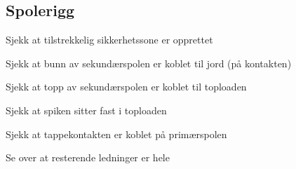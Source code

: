 \subsection{Spolerigg}
\begin{todolist}
    \item{Sjekk at tilstrekkelig sikkerhetssone er opprettet}
    \item{Sjekk at bunn av sekundærspolen er koblet til jord (på kontakten)}
    \item{Sjekk at topp av sekundærspolen er koblet til toploaden}
    \item{Sjekk at spiken sitter fast i toploaden}
    \item{Sjekk at tappekontakten er koblet på primærspolen}
    \item{Se over at resterende ledninger er hele}
    \iftoggle{INTERN}{
        \item{Sjekk at ledningen til hansken er skrudd godt fast}
    }{
        \item{Mål motstanden fra skruterminalen til hansken (jord) til flere punkter på hansken. Motstanden skal være under ~10 Ohm}
        \item{Sjekk at hansken ikke har store hull (>1cm åpning)}
    }
\end{todolist}